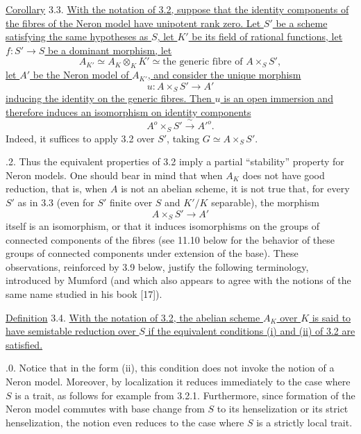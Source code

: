 \medskip
\noindent
\underline{Corollary} 3.3. \underline{With the notation of 3.2, suppose
that the identity components of the fibres of the Neron model have
unipotent rank zero.  Let $S'$ be a scheme satisfying the same hypotheses
as $S$, let $K'$ be its field of rational functions, let
$f:S'\longrightarrow S$ be a dominant morphism, let}
\[
 A_{K'}\simeq A_K\otimes_KK'
 \simeq \text{the generic fibre of }A\times_SS',
\]
\underline{let $A'$ be the Neron model of $A_{K'}$, and consider the unique
morphism}
\[
 u:A\times_SS'\longrightarrow A'
\]
\underline{inducing the identity on the generic fibres.  Then $u$ is an
open immersion and therefore induces an isomorphism on identity
components}
\begin{equation}\tag{3.3.1}
 A^o\times_SS'\xrightarrow{\ \sim\ }{A'}^o.
\end{equation}
Indeed, it suffices to apply 3.2 over $S'$, taking
$G\simeq A\times_SS'$.

\medskip
{}.2.  Thus the equivalent properties of 3.2 imply a partial
``stability'' property for Neron models.  One should bear in mind that when
$A_K$ does not have good reduction, that is, when $A$ is not an abelian
scheme, it is not true that, for every $S'$ as in 3.3 (even for $S'$ finite
over $S$ and $K'/K$ separable), the morphism
\[
 A\times_SS'\longrightarrow A'
\]
itself is an isomorphism, or that it induces isomorphisms on the groups of
connected components of the fibres (see 11.10 below for the behavior of
these groups of connected components under extension of the base).  These
observations, reinforced by 3.9 below, justify the following terminology,
introduced by Mumford (and which also appears to agree with the notions of
the same name studied in his book [17]).

\medskip
\noindent
\underline{Definition} 3.4. \underline{With the notation of 3.2, the
abelian scheme $A_K$ over $K$ is said to have semistable reduction over $S$
if the equivalent conditions (i) and (ii) of 3.2 are satisfied.}

\medskip
{}.0.  Notice that in the form (ii), this condition does not invoke the
notion of a Neron model.  Moreover, by localization it reduces immediately
to the case where $S$ is a trait, as follows for example from 3.2.1.
Furthermore, since formation of the Neron model commutes with base change
from $S$ to its henselization or its strict henselization, the notion even
reduces to the case where $S$ is a strictly local trait.
